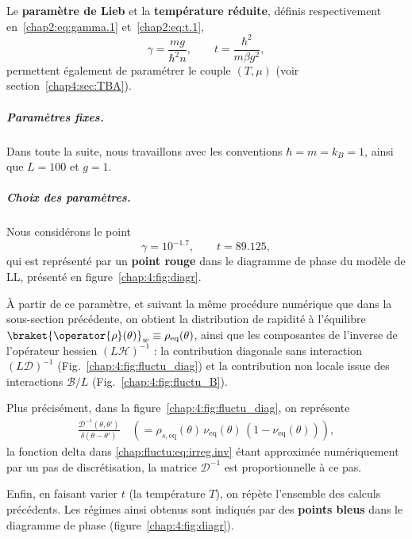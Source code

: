 \medskip

Le \textbf{paramètre de Lieb} et la \textbf{température réduite}, définis respectivement en~\eqref{chap2:eq:gamma.1} et~\eqref{chap2:eq:t.1},  
\begin{equation*}
	\gamma = \frac{m g}{\hbar^2 n}, 
	\qquad 
	t = \frac{\hbar^2}{m \beta g^2},
\end{equation*}
permettent également de paramétrer le couple $(T,\mu)$ (voir section~\ref{chap4:sec:TBA}).  

\subparagraph{Paramètres fixes.}  
Dans toute la suite, nous travaillons avec les conventions $\hbar = m = k_B = 1$, ainsi que $L = 100$ et $g = 1$.  

\medskip

\subparagraph{Choix des paramètres.}  
Nous considérons le point  
\begin{equation*}
	\gamma = 10^{-1.7}, 
	\qquad 
	t = 89.125 ,
\end{equation*}
qui est représenté par un \textbf{point rouge} dans le diagramme de phase du modèle de \gls{LL}, présenté en figure~\ref{chap:4:fig:diagr}.


\medskip

À partir de ce paramètre, et suivant la même procédure numérique que dans la sous-section précédente, on obtient la distribution de rapidité à l'équilibre 
\(\braket{\operator{\rho}(\theta)}_w \equiv \rho_{\mathrm{eq}}(\theta)\), ainsi que les composantes de l’inverse de l’opérateur hessien \((L\mathcal{H})^{-1}\) : la contribution diagonale sans interaction \((L\mathcal{D})^{-1}\) (Fig.~\ref{chap:4:fig:fluctu_diag}) et la contribution non locale issue des interactions \(\mathcal{B}/L\) (Fig.~\ref{chap:4:fig:fluctu_B}).

\medskip

Plus précisément, dans la figure~\ref{chap:4:fig:fluctu_diag}, on représente 
\begin{eqnarray*}
	\frac{\mathcal{D}^{-1}(\theta, \theta')}{\delta(\theta - \theta')} \quad  \left( =  \rho_{s, \mathrm{eq}}(\theta) \, \nu_{\mathrm{eq}}(\theta) \, (1 - \nu_{\mathrm{eq}}(\theta)) \right),
\end{eqnarray*}
la fonction delta dans \eqref{chap:fluctu:eq:irreg.inv} étant approximée numériquement par un pas de discrétisation, la matrice \(\mathcal{D}^{-1}\) est proportionnelle à ce pas.

\medskip

Enfin, en faisant varier $t$ (\ie la température \(T\)), on répète l'ensemble des calculs précédents.  
Les régimes ainsi obtenus sont indiqués par des {\bf points bleus} dans le diagramme de phase (figure~\ref{chap:4:fig:diagr}).



